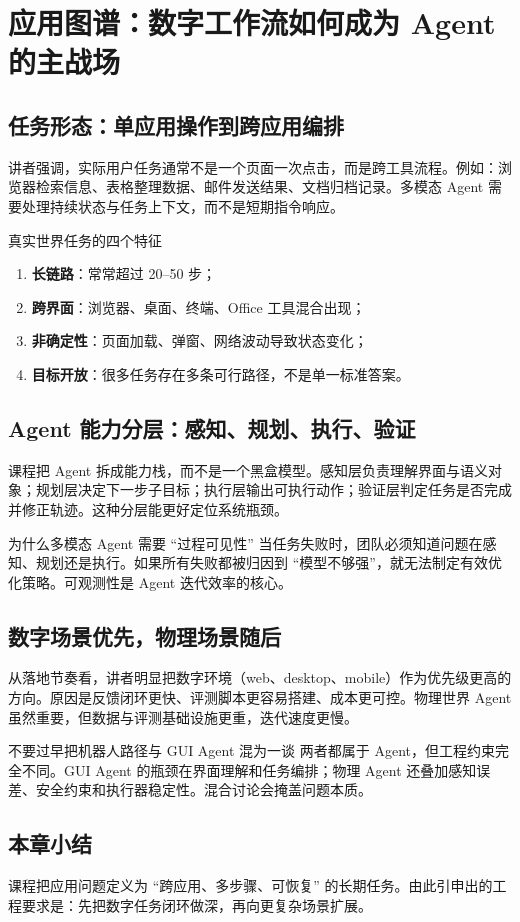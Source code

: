 \section{应用图谱：数字工作流如何成为 Agent 的主战场}

\subsection{任务形态：单应用操作到跨应用编排}
讲者强调，实际用户任务通常不是一个页面一次点击，而是跨工具流程。例如：浏览器检索信息、表格整理数据、邮件发送结果、文档归档记录。多模态 Agent 需要处理持续状态与任务上下文，而不是短期指令响应。

\begin{importantbox}{真实世界任务的四个特征}
\begin{enumerate}
    \item \textbf{长链路}：常常超过 20--50 步；
    \item \textbf{跨界面}：浏览器、桌面、终端、Office 工具混合出现；
    \item \textbf{非确定性}：页面加载、弹窗、网络波动导致状态变化；
    \item \textbf{目标开放}：很多任务存在多条可行路径，不是单一标准答案。
\end{enumerate}
\end{importantbox}

\subsection{Agent 能力分层：感知、规划、执行、验证}
课程把 Agent 拆成能力栈，而不是一个黑盒模型。感知层负责理解界面与语义对象；规划层决定下一步子目标；执行层输出可执行动作；验证层判定任务是否完成并修正轨迹。这种分层能更好定位系统瓶颈。

\begin{knowledgebox}{为什么多模态 Agent 需要 ``过程可见性''}
当任务失败时，团队必须知道问题在感知、规划还是执行。如果所有失败都被归因到 ``模型不够强''，就无法制定有效优化策略。可观测性是 Agent 迭代效率的核心。
\end{knowledgebox}

\subsection{数字场景优先，物理场景随后}
从落地节奏看，讲者明显把数字环境（web、desktop、mobile）作为优先级更高的方向。原因是反馈闭环更快、评测脚本更容易搭建、成本更可控。物理世界 Agent 虽然重要，但数据与评测基础设施更重，迭代速度更慢。

\begin{warningbox}{不要过早把机器人路径与 GUI Agent 混为一谈}
两者都属于 Agent，但工程约束完全不同。GUI Agent 的瓶颈在界面理解和任务编排；物理 Agent 还叠加感知误差、安全约束和执行器稳定性。混合讨论会掩盖问题本质。
\end{warningbox}

\subsection{本章小结}
课程把应用问题定义为 ``跨应用、多步骤、可恢复'' 的长期任务。由此引申出的工程要求是：先把数字任务闭环做深，再向更复杂场景扩展。

